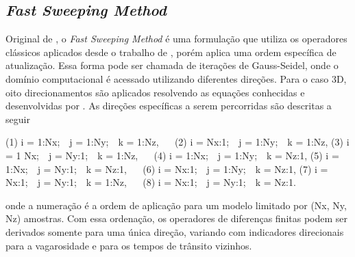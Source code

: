 \subsection*{\textit{Fast Sweeping Method}}

Original de , o \textit{Fast Sweeping Method} é uma formulação que utiliza os operadores clássicos aplicados desde o trabalho de , porém aplica uma ordem específica de atualização. Essa forma pode ser chamada de iterações de Gauss-Seidel, onde o domínio computacional é acessado utilizando diferentes direções. Para o caso 3D, oito direcionamentos são aplicados resolvendo as equações conhecidas e desenvolvidas por . As direções específicas a serem percorridas são descritas a seguir
\begin{center}
\noindent (1) i = 1:Nx;$\,\,\,\,$ j = 1:Ny;$\,\,\,\,$ k = 1:Nz,$\,\,\,\,\,\,\,\,$ (2) i = Nx:1;$\,\,\,\,$ j = 1:Ny;$\,\,\,\,$ k = 1:Nz, \newline 
\noindent (3) i = 1 Nx;$\,\,\,\,$ j = Ny:1;$\,\,\,\,$ k = 1:Nz,$\,\,\,\,\,\,\,\,$ (4) i = 1:Nx;$\,\,\,\,$ j = 1:Ny;$\,\,\,\,$ k = Nz:1, \newline
\noindent (5) i = 1:Nx;$\,\,\,\,$ j = Ny:1;$\,\,\,\,$ k = Nz:1,$\,\,\,\,\,\,\,\,$ (6) i = Nx:1;$\,\,\,\,$ j = 1:Ny;$\,\,\,\,$ k = Nz:1, \newline 
\noindent (7) i = Nx:1;$\,\,\,\,$ j = Ny:1;$\,\,\,\,$ k = 1:Nz,$\,\,\,\,\,\,\,\,$ (8) i = Nx:1;$\,\,\,\,$ j = Ny:1;$\,\,\,\,$ k = Nz:1. $\,\,\,\,\,\,\,\,\,\,\,\,\,$
\end{center}
\noindent onde a numeração é a ordem de aplicação para um modelo limitado por (Nx, Ny, Nz) amostras. Com essa ordenação, os operadores de diferenças finitas podem ser derivados somente para uma única direção, variando com indicadores direcionais para a vagarosidade e para os tempos de trânsito vizinhos.

